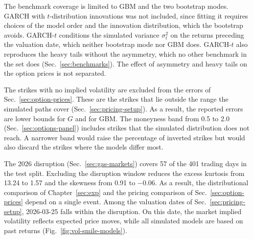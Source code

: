 The benchmark coverage is limited to GBM and the two bootstrap modes. GARCH with $t$-distribution innovations \parencite{bollerslevConditionallyHeteroskedasticTime1987} was not included, since fitting it requires choices of the model order and the innovation distribution, which the bootstrap avoids. GARCH-$t$ conditions the simulated variance $\sigma^2_t$ on the returns preceding the valuation date, which neither bootstrap mode nor GBM does. GARCH-$t$ also reproduces the heavy tails without the asymmetry, which no other benchmark in the set does (Sec.~\ref{sec:benchmarks}). The effect of asymmetry and heavy tails on the option prices is not separated.

The strikes with no implied volatility are excluded from the errors of Sec.~\ref{sec:option-prices}. These are the strikes that lie outside the range the simulated paths cover (Sec.~\ref{sec:pricing-setup}). As a result, the reported errors are lower bounds for $G$ and for GBM. The moneyness band from \num{0.5} to \num{2.0} (Sec.~\ref{sec:options-panel}) includes strikes that the simulated distribution does not reach. A narrower band would raise the percentage of inverted strikes but would also discard the strikes where the models differ most.

The 2026 disruption (Sec.~\ref{sec:gas-markets}) covers \num{57} of the \num{401} trading days in the test split. Excluding the disruption window reduces the excess kurtosis from \num{13.24} to \num{1.57} and the skewness from \num{0.91} to \num{-0.06}. As a result, the distributional comparison of Chapter~\ref{sec:exp} and the pricing comparison of Sec.~\ref{sec:option-prices} depend on a single event. Among the valuation dates of Sec.~\ref{sec:pricing-setup}, 2026-03-25 falls within the disruption. On this date, the market implied volatility reflects expected price moves, while all simulated models are based on past returns (Fig.~\ref{fig:vol-smile-models}).